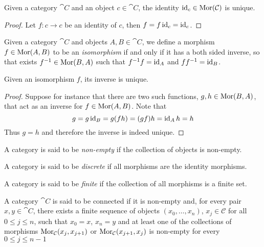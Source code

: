 \begin{corollary}\label{cor: unique identity}
Given a category \(\cat C\) and an object \(c \in \cat C\), the identity \(\operatorname{id}_c
\in \operatorname{Mor}(\mathcal C)\) is unique.
\end{corollary}

\begin{proof}
Let \(f: c \to c\) be an identity of \(c\), then \(f = f \operatorname{id}_c = \operatorname{id}_c\).
\end{proof}

\begin{definition}[Isomorphism]\label{def:isomorphism}
Given a category \(\cat{C}\) and objects \(A, B \in \cat{C}\), we define a
morphism \(f \in \operatorname{Mor}(A, B)\) to be an \emph{isomorphism} if and only if it has
a both sided inverse, so that exists \(f^{-1} \in \operatorname{Mor}(B, A)\) such that
\(f^{-1}f = \operatorname{id}_A\) and \(ff^{-1} = \operatorname{id}_B\).
\end{definition}

\begin{proposition}\label{prop: iso unique inverse}
Given an isomorphism \(f\), its inverse is unique.
\end{proposition}

\begin{proof}
Suppose for instance that there are two such functions, \(g, h \in \operatorname{Mor}(B, A)\),
that act as an inverse for \(f \in \operatorname{Mor}(A, B)\). Note that
\[
  g = g \operatorname{id}_B = g(f h) = (g f) h = \operatorname{id}_A h = h
\]
Thus \(g = h\) and therefore the inverse is indeed unique.
\end{proof}

\begin{definition}
\label{def:non-empty-category}
A category is said to be \emph{non-empty} if the collection of objects is
non-empty.
\end{definition}

\begin{definition}
\label{def:discrete-category}
A category is said to be \emph{discrete} if all morphisms are the identity
morphisms.
\end{definition}

\begin{definition}
\label{def:finite-category}
A category is said to be \emph{finite} if the collection of all morphisms is a
finite set.
\end{definition}

\begin{definition}
\label{def:connected-category}
A category \(\cat C\) is said to be connected if it is non-empty and, for every
pair \(x, y \in \cat C\), there exists a finite sequence of objects \((x_0,
\dots, x_n)\), \(x_j \in \mathcal C\) for all \(0 \leq j \leq n\), such that
\(x_0 = x\), \(x_n = y\) and at least one of the collections of morphisms
\(\operatorname{Mor}_{\mathcal C}(x_j, x_{j+1})\) or \(\operatorname{Mor}_{\mathcal C}(x_{j+1}, x_j)\) is non-empty
for every \(0 \leq j \leq n - 1\)
\end{definition}


